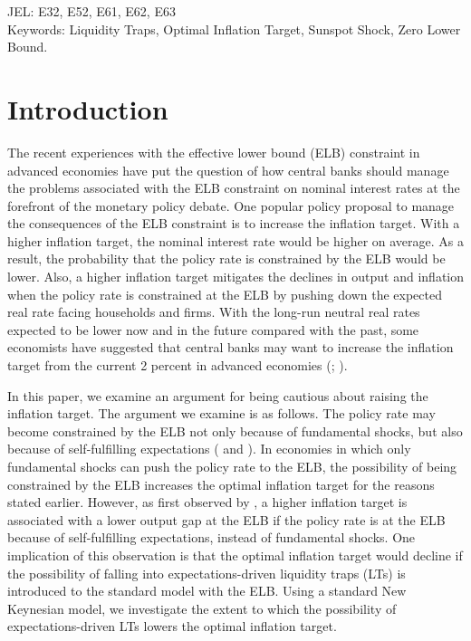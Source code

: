 \documentclass[11pt]{article}
\begin{document}
	\vspace{5em}
	
	\noindent JEL: E32, E52, E61, E62, E63\\
	
	\noindent Keywords: Liquidity Traps, Optimal Inflation Target, Sunspot Shock, Zero Lower Bound.
	
	\newpage
	
	\section{Introduction}
	\label{S:Introduction}
	
	The recent experiences with the effective lower bound (ELB) constraint in advanced economies have put the question of how central banks should manage the problems associated with the ELB constraint on nominal interest rates at the forefront of the monetary policy debate. One popular policy proposal to manage the consequences of the ELB constraint is to increase the inflation target. With a higher inflation target, the nominal interest rate would be higher on average. As a result, the probability that the policy rate is constrained by the ELB would be lower. Also, a higher inflation target mitigates the declines in output and inflation when the policy rate is constrained at the ELB by pushing down the expected real rate facing households and firms. With the long-run neutral real rates expected to be lower now and in the future compared with the past, some economists have suggested that central banks may want to increase the inflation target from the current 2 percent in advanced economies (\citet{Ball2013}; \citet{BlanchardDellAricciaMauro2010}).
	
	In this paper, we examine an argument for being cautious about raising the inflation target. The argument we examine is as follows. The policy rate may become constrained by the ELB not only because of fundamental shocks, but also because of self-fulfilling expectations (\citet{BenhabibSchmittGroheUribe2001} and \citet{Bullard2010}). In economies in which only fundamental shocks can push the policy rate to the ELB, the possibility of being constrained by the ELB increases the optimal inflation target for the reasons stated earlier. However, as first observed by \citet{MertensRavn2014}, a higher inflation target is associated with a lower output gap at the ELB if the policy rate is at the ELB because of self-fulfilling expectations, instead of fundamental shocks. One implication of this observation is that the optimal inflation target would decline if the possibility of falling into expectations-driven liquidity traps (LTs) is introduced to the standard model with the ELB. Using a standard New Keynesian model, we investigate the extent to which the possibility of expectations-driven LTs lowers the optimal inflation target. 
	
\end{document}
